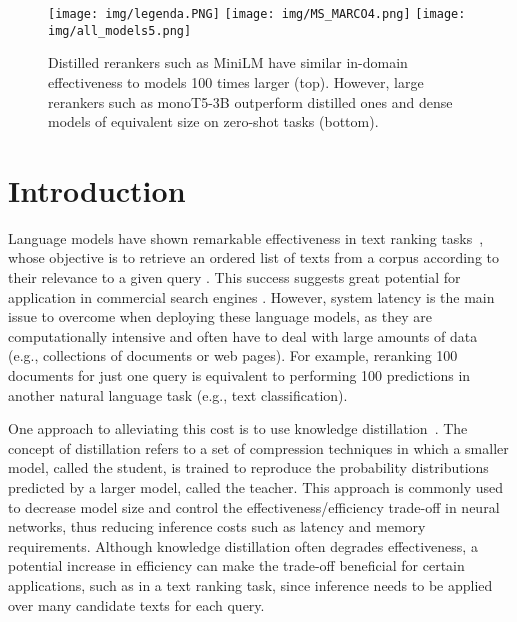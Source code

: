 \documentclass[sigconf,nonacm]{acmart}
\begin{document}
\maketitle


  \begin{figure}[ht]
  \centering
  \texttt{[image: img/legenda.PNG]}
  \texttt{[image: img/MS\_MARCO4.png]}
  \texttt{[image: img/all\_models5.png]}
  \caption{Distilled rerankers such as MiniLM have similar in-domain effectiveness to models 100 times larger (top). However, large rerankers such as monoT5-3B outperform distilled ones and dense models of equivalent size on zero-shot tasks (bottom).}
  \label{fig:graphs_avg}
\end{figure}



\section{Introduction}

Language models have shown remarkable effectiveness in text ranking tasks~\cite{nogueira2019passage,macavaney2019cedr,qu2021rocketqa,gao2021coil,gao-callan-2022-unsupervised}, whose objective is to retrieve an ordered list of texts from a corpus according to their relevance to a given query \cite{lin2020pretrained}. This success suggests great potential for application in commercial search engines \cite{linkedIn}. However, system latency is the main issue to overcome when deploying these language models, as they are computationally intensive and often have to deal with large amounts of data (e.g., collections of documents or web pages). For example, reranking 100 documents for just one query is equivalent to performing 100 predictions in another natural language task (e.g., text classification).


One approach to alleviating this cost is to use knowledge distillation~\cite{hinton2015}. The concept of distillation refers to a set of compression techniques in which a smaller model, called the student, is trained to reproduce the probability distributions predicted by a larger model, called the teacher. This approach is commonly used to decrease model size and control the effectiveness/efficiency trade-off in neural networks, thus reducing inference costs such as latency and memory requirements.
Although knowledge distillation often degrades effectiveness, a potential increase in efficiency can make the trade-off beneficial for certain applications, such as in a text ranking task, since inference needs to be applied over many candidate texts for each query.
\end{document}
